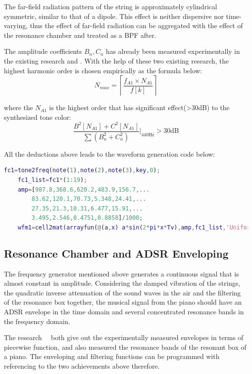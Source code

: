 \documentclass[conference]{IEEEtran}
\begin{document}
The far-field radiation pattern of the string is approximately cylindrical symmetric, similar to that of a dipole. This effect is neither dispersive nor time-varying, thus the effect of far-field radiation can be aggregated with the effect of the resonance chamber and treated as a BPF after.

The amplitude coefficients \(B_{n},C_{n}\) has already been measured experimentally in the existing research \cite{cmf_piano} and \cite{css_piano}. With the help of these two existing research, the highest harmonic order is chosen empirically as the formula below:
\begin{equation}
	N_{max}=\left\lceil \frac{f_{A1}\times N_{A1}}{f[k]} \right\rceil
\end{equation}

where the \(N_{A1}\) is the highest order that has significant effect(>30dB) to the synthesized tone color:
\begin{equation}
	\frac{B^{2}[N_{A1}]+C^{2}[N_{A1}]}{\sum(B_{n}^{2}+C_{n}^{2})}\lvert_{440\text{Hz}}>30\text{dB}
\end{equation}

All the deductions above leads to the waveform generation code below:
\begin{lstlisting}[language=matlab,style=matlab]
	fc1=tone2freq(note(1),note(2),note(3),key,0);
    fc1_list=fc1*(1:19);
    amp=[987.8,368.6,620.2,483.9,156.7,...
		83.62,120.1,70.73,5.348,24.41,...
		27.35,21.3,10.31,6.477,15.91,...
		3.495,2.546,0.4751,0.8858]/1000;
    wfm1=cell2mat(arrayfun(@(a,x) a*sin(2*pi*x*Tv),amp,fc1_list,'UniformOutput',false).');
\end{lstlisting}

\subsection{Resonance Chamber and ADSR Enveloping}
The frequency generator mentioned above generates a continuous signal that is almost constant in amplitude. Considering the damped vibration of the strings, the quadratic inverse attenuation of the sound waves in the air and the filtering of the resonance box together, the musical signal from the piano should have an ADSR envelope in the time domain and several concentrated resonance bands in the frequency domain.

The research~\cite{cmf_piano}~\cite{css_piano} both give out the experimentally measured envelopes in terms of piecewise function, and \cite{css_piano} also measured the resonance bands of the resonant box of a piano. The enveloping and filtering functions can be programmed with referencing to the two achievements above therefore.
\end{document}
